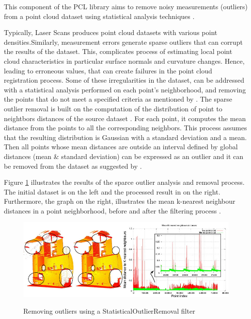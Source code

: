 \documentclass[12pt]{report}
\begin{document}
This component of the PCL library aims to remove noisy measurements (outliers) from a point cloud dataset using statistical analysis techniques .

Typically, Laser Scans produces point cloud datasets with various point densities.Similarly, measurement errors generate sparse outliers that can corrupt the results of the dataset.
This, complicates process of estimating local point cloud characteristics in particular surface normals and curvature changes. Hence, leading to erroneous values, that can create failures in the point cloud registration process.
Some of these irregularities in the dataset, can be addressed with a statistical analysis performed on each point's neighborhood, and removing the points that do not meet a specified criteria as mentioned by .
The sparse outlier removal is built on  the computation of the distribution  of point to neightbors distances of the source dataset .
For each point, it computes the mean distance from the points to all the corresponding neighbors. This process assumes that the resulting distribution is Gaussian with a standard deviation and a mean.
Then all points whose mean distances are outside an interval defined by global distances (mean \& standard deviation) can be expressed as an outlier and it can be removed from the dataset as suggested by .

Figure \ref{fig:statistical_removal_2} illustrates the results of the sparce outlier analysis and  removal process.
The initial dataset is on the left and the processed result in on the right. Furthermore, the graph on the right, illustrates the mean k-nearest neighbour distances in a point 
neighborhood, before and after the filtering process \cite[]{Rusu_ICRA2011_PCL}.

\begin{figure}[H]%
  \centering
  \includegraphics[width=1\textwidth]{statistical_removal_2.jpg}
 \caption{Removing outliers using a StatisticalOutlierRemoval filter}\cite[]{Rusu_ICRA2011_PCL}
 \label{fig:statistical_removal_2} 
\end{figure}
\end{document}
